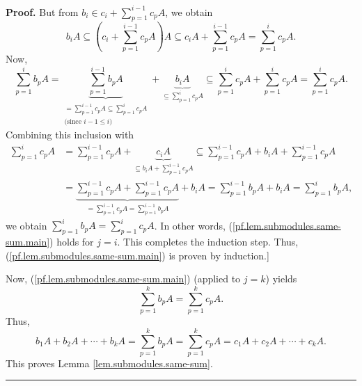 \documentclass[numbers=enddot,12pt,final,onecolumn,notitlepage]{scrartcl}%
\theoremstyle{definition}
\newenvironment{proof}[1][Proof]{\noindent\textbf{#1.} }{\ \rule{0.5em}{0.5em}}
\let\sumnonlimits\sum
\renewcommand{\sum}{\sumnonlimits\limits}
\begin{document}
\begin{proof}
But from $b_{i}\in c_{i}+\sum_{p=1}^{i-1}c_{p}A$, we obtain%
\[
b_{i}A\subseteq\left(  c_{i}+\sum_{p=1}^{i-1}c_{p}A\right)  A\subseteq
c_{i}A+\sum_{p=1}^{i-1}c_{p}A=\sum_{p=1}^{i}c_{p}A.
\]
Now,%
\[
\sum_{p=1}^{i}b_{p}A=\underbrace{\sum_{p=1}^{i-1}b_{p}A}_{\substack{=\sum
_{p=1}^{i-1}c_{p}A\subseteq\sum_{p=1}^{i}c_{p}A\\\text{(since }i-1\leq
i\text{)}}}+\underbrace{b_{i}A}_{\subseteq\sum_{p=1}^{i}c_{p}A}\subseteq
\sum_{p=1}^{i}c_{p}A+\sum_{p=1}^{i}c_{p}A=\sum_{p=1}^{i}c_{p}A.
\]
Combining this inclusion with%
\begin{align*}
\sum_{p=1}^{i}c_{p}A  &  =\sum_{p=1}^{i-1}c_{p}A+\underbrace{c_{i}%
A}_{\subseteq b_{i}A+\sum_{p=1}^{i-1}c_{p}A}\subseteq\sum_{p=1}^{i-1}%
c_{p}A+b_{i}A+\sum_{p=1}^{i-1}c_{p}A\\
&  =\underbrace{\sum_{p=1}^{i-1}c_{p}A+\sum_{p=1}^{i-1}c_{p}A}_{=\sum
_{p=1}^{i-1}c_{p}A=\sum_{p=1}^{i-1}b_{p}A}+b_{i}A=\sum_{p=1}^{i-1}b_{p}%
A+b_{i}A=\sum_{p=1}^{i}b_{p}A,
\end{align*}
we obtain $\sum_{p=1}^{i}b_{p}A=\sum_{p=1}^{i}c_{p}A$. In other words,
(\ref{pf.lem.submodules.same-sum.main}) holds for $j=i$. This completes the
induction step. Thus, (\ref{pf.lem.submodules.same-sum.main}) is proven by induction.]

Now, (\ref{pf.lem.submodules.same-sum.main}) (applied to $j=k$) yields%
\[
\sum_{p=1}^{k}b_{p}A=\sum_{p=1}^{k}c_{p}A.
\]
Thus,
\[
b_{1}A+b_{2}A+\cdots+b_{k}A=\sum_{p=1}^{k}b_{p}A=\sum_{p=1}^{k}c_{p}%
A=c_{1}A+c_{2}A+\cdots+c_{k}A.
\]
This proves Lemma \ref{lem.submodules.same-sum}.
\end{proof}
\end{document}

